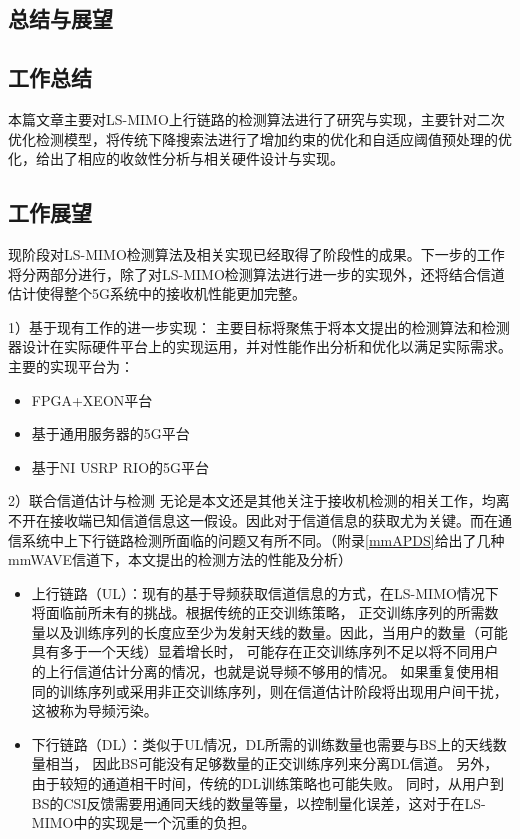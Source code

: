\documentclass[bachelor,oneside]{seuthesis} %
\begin{document}
\begin{spacing}{1.5}
\begin{Main}
\chapter{总结与展望}\label{chapter:6}


\section{工作总结}

本篇文章主要对LS-MIMO上行链路的检测算法进行了研究与实现，主要针对二次优化检测模型，将传统下降搜索法进行了增加约束的优化和自适应阈值预处理的优化，给出了相应的收敛性分析与相关硬件设计与实现。



\section{工作展望}
现阶段对LS-MIMO检测算法及相关实现已经取得了阶段性的成果。下一步的工作将分两部分进行，除了对LS-MIMO检测算法进行进一步的实现外，还将结合信道估计使得整个5G系统中的接收机性能更加完整。

1）基于现有工作的进一步实现：
主要目标将聚焦于将本文提出的检测算法和检测器设计在实际硬件平台上的实现运用，并对性能作出分析和优化以满足实际需求。
主要的实现平台为：
\begin{itemize}
\item FPGA+XEON平台

\item 基于通用服务器的5G平台

\item 基于NI USRP RIO的5G平台
\end{itemize}

2）联合信道估计与检测
无论是本文还是其他关注于接收机检测的相关工作，均离不开在接收端已知信道信息这一假设。因此对于信道信息的获取尤为关键。而在通信系统中上下行链路检测所面临的问题又有所不同。（附录\ref{mmAPDS}给出了几种mmWAVE信道下，本文提出的检测方法的性能及分析）
\begin{itemize}
  \item 上行链路（UL）：现有的基于导频获取信道信息的方式，在LS-MIMO情况下将面临前所未有的挑战。根据传统的正交训练策略，
  正交训练序列的所需数量以及训练序列的长度应至少为发射天线的数量。因此，当用户的数量（可能具有多于一个天线）显着增长时，
  可能存在正交训练序列不足以将不同用户的上行信道估计分离的情况，也就是说导频不够用的情况。
  如果重复使用相同的训练序列或采用非正交训练序列，则在信道估计阶段将出现用户间干扰，这被称为导频污染。
  \item 下行链路（DL）：类似于UL情况，DL所需的训练数量也需要与BS上的天线数量相当，
  因此BS可能没有足够数量的正交训练序列来分离DL信道。
   另外，由于较短的通道相干时间，传统的DL训练策略也可能失败。
    同时，从用户到BS的CSI反馈需要用通同天线的数量等量，以控制量化误差，这对于在LS-MIMO中的实现是一个沉重的负担。
\end{itemize}


\end{Main}
\end{spacing}
\end{document}
